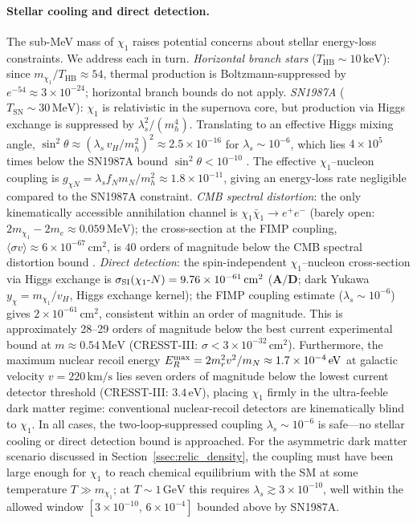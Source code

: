 \documentclass[11pt]{article}
\newcommand{\CatAD}{\textbf{A/D}}
\begin{document}
\paragraph{Stellar cooling and direct detection.}
The sub-MeV mass of $\chi_1$ raises potential concerns about stellar energy-loss
constraints. We address each in turn.
\emph{Horizontal branch stars} ($T_\mathrm{HB}\sim 10\,\mathrm{keV}$): since
$m_{\chi_1}/T_\mathrm{HB}\approx 54$, thermal production is Boltzmann-suppressed
by $e^{-54}\approx 3\times10^{-24}$; horizontal branch bounds do not apply.
\emph{SN1987A} ($T_\mathrm{SN}\sim 30\,\mathrm{MeV}$): $\chi_1$ is relativistic
in the supernova core, but production via Higgs exchange is suppressed by
$\lambda_s^2/(m_h^4)$. Translating to an effective Higgs mixing angle,
$\sin^2\!\theta \approx (\lambda_s\,v_H/m_h^2)^2 \approx 2.5\times10^{-16}$ for
$\lambda_s\sim10^{-6}$, which lies $4\times10^5$ times below the SN1987A bound
$\sin^2\!\theta < 10^{-10}$ \cite{Krnjaic2015HiggsPortal}. The
effective $\chi_1$--nucleon coupling is $g_{\chi N} = \lambda_s f_N m_N/m_h^2
\approx 1.8\times10^{-11}$, giving an energy-loss rate negligible compared to
the SN1987A constraint.
\emph{CMB spectral distortion}: the only kinematically accessible annihilation
channel is $\chi_1\bar{\chi}_1\to e^+e^-$ (barely open:
$2m_{\chi_1} - 2m_e \approx 0.059\,\mathrm{MeV}$); the cross-section at the
FIMP coupling, $\langle\sigma v\rangle\approx 6\times10^{-67}\,\mathrm{cm}^2$,
is $40$ orders of magnitude below the CMB spectral distortion bound
\cite{Slatyer2016CMB}.
\emph{Direct detection}: the spin-independent $\chi_1$--nucleon cross-section via
Higgs exchange is $\sigma_{\rm SI}(\chi_1\text{-}N) = 9.76\times10^{-61}\,\mathrm{cm}^2$
($\CatAD$; dark Yukawa $y_\chi = m_{\chi_1}/v_H$, Higgs exchange kernel);
the FIMP coupling estimate ($\lambda_s\sim10^{-6}$) gives $2\times10^{-61}\,\mathrm{cm}^2$,
consistent within an order of magnitude.
This is approximately 28--29 orders of magnitude below the best current experimental
bound at $m\approx0.54\,\mathrm{MeV}$ (CRESST-III: $\sigma < 3\times10^{-32}\,\mathrm{cm}^2$).
Furthermore, the maximum nuclear recoil energy $E_R^{\rm max} = 2m_r^2v^2/m_N \approx 1.7\times10^{-4}\,\mathrm{eV}$
at galactic velocity $v = 220\,\mathrm{km/s}$ lies seven orders of magnitude below
the lowest current detector threshold (CRESST-III: $3.4\,\mathrm{eV}$), placing $\chi_1$
firmly in the ultra-feeble dark matter regime: conventional nuclear-recoil detectors
are kinematically blind to $\chi_1$.
In all cases, the two-loop-suppressed coupling $\lambda_s\sim10^{-6}$ is
safe---no stellar cooling or direct detection bound is approached.
For the asymmetric dark matter scenario discussed in Section~\ref{ssec:relic_density},
the coupling must have been large enough for $\chi_1$ to reach chemical equilibrium
with the SM at some temperature $T\gg m_{\chi_1}$; at $T\sim 1\,\mathrm{GeV}$ this
requires $\lambda_s\gtrsim 3\times10^{-10}$, well within the allowed window
$[3\times10^{-10},\,6\times10^{-4}]$ bounded above by SN1987A.
\end{document}
